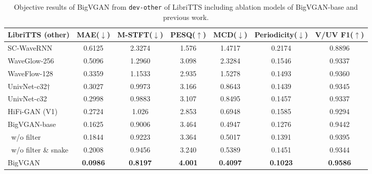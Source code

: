 \documentclass{article} \usepackage{iclr2023_conference,times}
\theoremstyle{plain}
\theoremstyle{definition}
\theoremstyle{remark}
\begin{document}
\begin{table*}[t]
\caption{\footnotesize
Objective results of BigVGAN from \texttt{dev-other} of LibriTTS including ablation models of BigVGAN-base and previous work.
}
\label{libritts-numeric-other}
\vspace{-0.05cm}
\begin{center}
\begin{small}
\begin{adjustbox}{width=0.9\textwidth}
\begin{tabular}{l|cccccc}
\toprule
LibriTTS (other)  & MAE($\downarrow$) & M-STFT($\downarrow$) & PESQ($\uparrow$) & MCD($\downarrow$) & Periodicity($\downarrow$) & V/UV F1($\uparrow$) \\
\midrule
SC-WaveRNN & 0.6125 & 2.3274 & 1.576 & 1.4717 & 0.2174 & 0.8896 \\
WaveGlow-256 & 0.5096 & 1.2960 & 3.098 & 2.3284 & 0.1546 & 0.9337 \\
WaveFlow-128 & 0.3359 & 1.1533 & 2.935 & 1.5278 & 0.1493 & 0.9360 \\
UnivNet-c32$\dagger$ & 0.3027 & 0.9973 & 3.166 & 0.8643 & 0.1439 & 0.9345 \\
UnivNet-c32 & 0.2998 & 0.9883 & 3.107 & 0.8495 & 0.1457 & 0.9337 \\
HiFi-GAN (V1)   & 0.2724 & 1.026 & 2.853 & 0.6948 & 0.1585 & 0.9294\\
\midrule
BigVGAN-base    & 0.1625 & 0.9006 & 3.464 & 0.4947 & 0.1276 & 0.9442 \\
\ w/o filter    & 0.1844 & 0.9223 & 3.364 & 0.5017 & 0.1391 & 0.9395 \\
\ w/o filter \& snake   & 0.2008 & 0.9456 & 3.240 & 0.5389 & 0.1451 & 0.9344 \\
\midrule
BigVGAN    & \textbf{0.0986} & \textbf{0.8197} & \textbf{4.001} & \textbf{0.4097} & \textbf{0.1023} & \textbf{0.9586}\\
\bottomrule
\end{tabular}
\end{adjustbox}
\end{small}
\end{center}
\vskip -0.1in
\end{table*}
\end{document}
